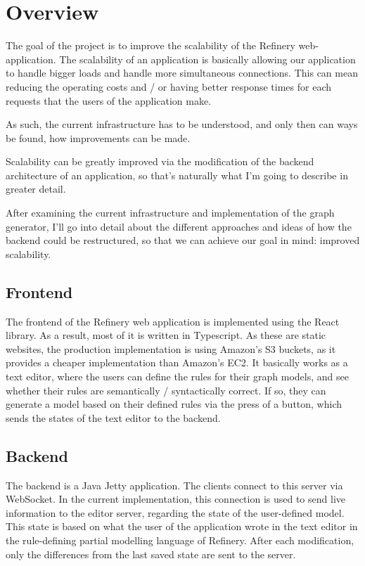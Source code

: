\chapter{Overview} 
	\label{overview}
	The goal of the project is to improve the scalability of the Refinery web-application. 
	The scalability of an application is basically allowing our application to handle bigger loads and handle more simultaneous connections.
	This can mean reducing the operating costs and / or having better response times for each requests that the users of the application make. 

	As such, the current
	infrastructure has to be understood, and only then can ways be found, how improvements can be made.

	Scalability can be greatly improved via the modification of the backend architecture of an application, so that's naturally what
	I'm going to describe in greater detail. 

	After examining the current infrastructure and implementation of the graph generator, 
	I'll go into detail about the different approaches and ideas of how the backend could be restructured,
	so that we can achieve our goal in mind: improved scalability. 

\section{Frontend}
	The frontend of the Refinery web application is implemented using the React library. As a result, most of it is written in Typescript.
	As these are static websites, the production implementation is using Amazon's S3 buckets, as it provides a cheaper implementation
	than Amazon's EC2. 
	It basically works as a text editor, where the users can define the rules for their graph models, and see whether
	their rules are semantically / syntactically correct. If so, they can generate a model based on their defined rules
	via the press of a button, which sends the states of the text editor to the backend.

\section{Backend}

	The backend is a Java Jetty application. The clients connect to this server via WebSocket. 
	In the current implementation,
	this connection is used to send live information to the editor server, 
	regarding the state of the user-defined model.
	This state is based on what the user of the application wrote in the text editor in the
	rule-defining partial modelling language of Refinery. After each modification, only the differences
	from the last saved state are sent to the server.

